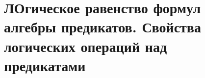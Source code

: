 \section{ЛОгическое равенство формул алгебры предикатов. Свойства логических операций над предикатами}